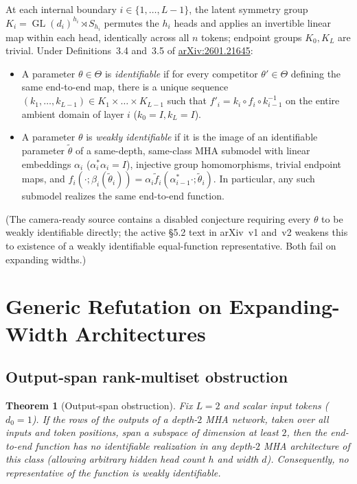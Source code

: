 \documentclass[11pt]{article}
\theoremstyle{plain}
\newtheorem{theorem}{Theorem}
\theoremstyle{definition}
\theoremstyle{remark}
\DeclareMathOperator{\GL}{GL}
\begin{document}
At each internal boundary $i \in \{1, \dots, L-1\}$, the latent symmetry group $K_i = \GL(d_i)^{h_i} \rtimes S_{h_i}$ permutes the $h_i$ heads and applies an invertible linear map within each head, identically across all $n$ tokens; endpoint groups $K_0, K_L$ are trivial.
Under Definitions~3.4 and~3.5 of \href{https://arxiv.org/abs/2601.21645}{arXiv:2601.21645}:
\begin{itemize}[leftmargin=2em,itemsep=2pt]
\item A parameter $\theta \in \Theta$ is \emph{identifiable} if for every competitor $\theta' \in \Theta$ defining the same end-to-end map, there is a unique sequence $(k_1, \dots, k_{L-1}) \in K_1 \times \dots \times K_{L-1}$ such that $f'_i = k_i \circ f_i \circ k_{i-1}^{-1}$ on the entire ambient domain of layer $i$ ($k_0 = I, k_L = I$).
\item A parameter $\theta$ is \emph{weakly identifiable} if it is the image of an identifiable parameter $\tilde{\theta}$ of a same-depth, same-class MHA submodel with linear embeddings $\alpha_i$ ($\alpha_i^*\alpha_i = I$), injective group homomorphisms, trivial endpoint maps, and $f_i(\cdot; \beta_i(\tilde{\theta}_i)) = \alpha_i \tilde{f}_i(\alpha_{i-1}^* \cdot; \tilde{\theta}_i)$. In particular, any such submodel realizes the same end-to-end function.
\end{itemize}
(The camera-ready source contains a disabled conjecture requiring every $\theta$ to be weakly identifiable directly; the active §5.2 text in arXiv~v1 and~v2 weakens this to existence of a weakly identifiable equal-function representative. Both fail on expanding widths.)

\section{Generic Refutation on Expanding-Width Architectures}

\subsection{Output-span rank-multiset obstruction}

\begin{theorem}[Output-span obstruction]\label{thm:span}
Fix $L = 2$ and scalar input tokens ($d_0 = 1$). If the rows of the outputs of a depth-$2$ MHA network, taken over all inputs and token positions, span a subspace of dimension at least $2$, then the end-to-end function has no identifiable realization in any depth-$2$ MHA architecture of this class (allowing arbitrary hidden head count $h$ and width $d$). Consequently, no representative of the function is weakly identifiable.
\end{theorem}
\end{document}

